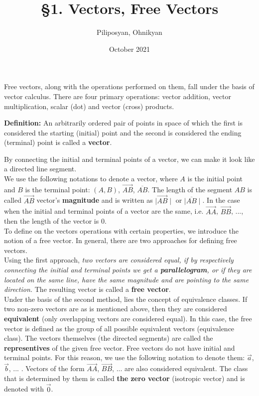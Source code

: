 \documentclass[11pt]{article}
\title{\S1. Vectors, Free Vectors}
\author{Piliposyan, Ohnikyan}
\date{October 2021}
\begin{document}
\maketitle

Free vectors, along with the operations performed on them, fall under the basis of vector calculus. There are four primary operations: vector addition, vector multiplication, scalar (dot) and vector (cross) products.

\begin{center}
	\textbf{Definition:} An arbitrarily ordered pair of points in space of which the first is considered the starting (initial) point and the second is considered the ending (terminal) point is called a \textbf{vector}.
\end{center}

\noindent By connecting the initial and terminal points of a vector, we can make it look like a directed line segment.\\

\noindent We use the following notations to denote a vector, where \(A\) is the initial point and \(B\) is the terminal point: \((A,B)\), \(\overrightarrow{AB}\), \(\overline{AB}\). The length of the segment \(AB\) is called \(\overrightarrow{AB}\) vector's \textbf{magnitude} and is written as \(\mid{\overrightarrow{AB}}\mid\) or \(\mid{\overline{AB}}\mid\). In the case when the initial and terminal points of a vector are the same, i.e. \(\overrightarrow{AA}\), \(\overrightarrow{BB}\), ..., then the length of the vector is 0. \\

\noindent To define on the vectors operations with certain properties, we introduce the notion of a free vector. In general, there are two approaches for defining free vectors. \\

\noindent Using the first approach, \textit{two vectors are considered equal, if by respectively connecting the initial and terminal points we get a \textbf{parallelogram}, or if they are located on the same line, have the same magnitude and are pointing to the same direction.} The resulting vector is called a \textbf{free vector}. \\

\noindent Under the basis of the second method, lies the concept of equivalence classes. If two non-zero vectors are as is mentioned above, then they are considered \textbf{equivalent} (only overlapping vectors are considered equal). In this case, the free vector is defined as the group of all possible equivalent vectors (equivalence class). The vectors themselves (the directed segments) are called the \textbf{representives} of the given free vector. Free vectors do not have initial and terminal points. For this reason, we use the following notation to denote them: \(\vec{a}\), \(\vec{b}\), ... . Vectors of the form \(\overrightarrow{AA}\), \(\overrightarrow{BB}\), ... are also considered equivalent. The class that is determined by them is called \textbf{the zero vector} (isotropic vector) and is denoted with \(\vec{0}\). \\
\end{document}
